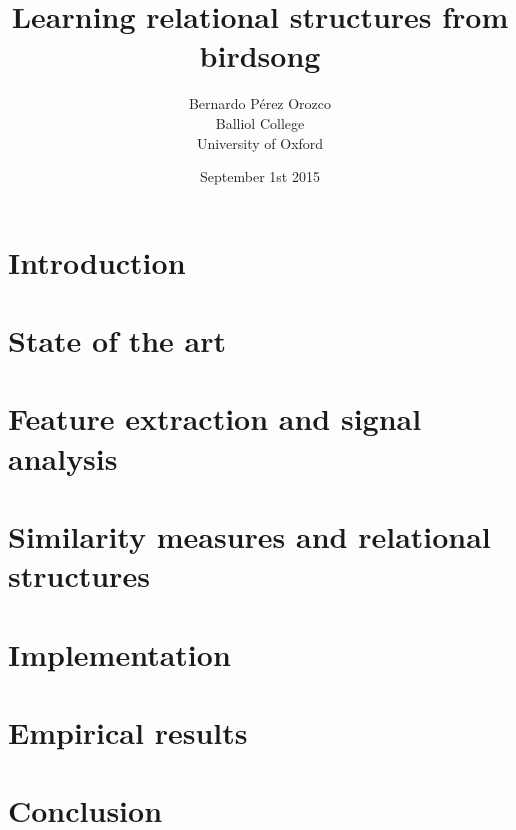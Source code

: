 \documentclass[pdftex,12pt,a4paper]{report}
\title{Learning relational structures from birdsong}
\author{Bernardo Pérez Orozco\\Balliol College\\University of Oxford}
\date{ September 1st 2015 }
\theoremstyle{definition}
\theoremstyle{remark}
\begin{document}
 

\chapter{Introduction}

 
\chapter{State of the art}



\chapter{Feature extraction and signal analysis}
 

 
\chapter{Similarity measures and relational structures}



\chapter{Implementation}



\chapter{Empirical results}



\chapter{Conclusion}





\end{document}
